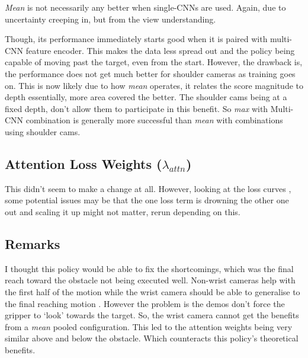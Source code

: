 \emph{Mean} is not necessarily any better when single-CNNs are used. Again, due to uncertainty creeping in, but from the view understanding.

Though, its performance immediately starts good when it is paired with multi-CNN feature encoder. This makes the data less spread out  and the policy being capable of moving past the target, even from the start. However, the drawback is, the performance does not get much better for shoulder cameras as training goes on. This is now likely due to how \emph{mean} operates, it relates the score magnitude to depth essentially, more area covered the better. The shoulder cams being at a fixed depth, don't allow them to participate in this benefit. So \emph{max} with Multi-CNN combination is generally more successful than \emph{mean} with combinations using shoulder cams.

\subsection{Attention Loss Weights ($\lambda_{attn}$)}
This didn't seem to make a change at all. However, looking at the loss curves , some potential issues may be that the one loss term is drowning the other one out and scaling it up might not matter, rerun depending on this.


\subsection{Remarks}
I thought this policy would be able to fix the shortcomings, which was the final reach toward the obstacle not being executed well. Non-wrist cameras help with the first half of the motion while the wrist camera should be able to generalise to the final reaching motion . However the problem is the demos don't force the gripper to `look' towards the target. So, the wrist camera cannot get the benefits from a \emph{mean} pooled configuration. This led to the attention weights being very similar above and below the obstacle. Which counteracts this policy's theoretical benefits.

